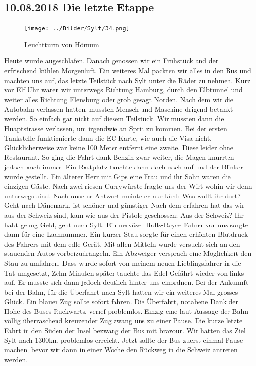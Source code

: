 \subsection{10.08.2018 Die letzte Etappe}

\begin{figure} 
  \begin{centering}
    \texttt{[image: ../Bilder/Sylt/34.png]}
    \caption{Leuchtturm von Hörnum}
  \end{centering}
\end{figure} 

Heute wurde augeschlafen.
Danach genossen wir ein Frühstück and der erfrischend kühlen Morgenluft.
Ein weiteres Mal packten wir alles in den Bus und machten uns auf, das letzte Teilstück nach Sylt unter die Räder zu nehmen.
Kurz vor Elf Uhr waren wir unterwegs Richtung Hamburg, durch den Elbtunnel und weiter alles Richtung Flensburg oder grob gesagt Norden.
Nach dem wir die Autobahn verlassen hatten, mussten Mensch und Maschine drigend betankt werden.
So einfach gar nicht auf diesem Teilstück.
Wir mussten dann die Huaptstrasse verlassen, um irgendwie an Sprit zu kommen.
Bei der ersten Tankstelle funktionierte dann die EC Karte, wie auch die Visa nicht.
Glücklicherweise war keine 100 Meter entfernt eine zweite.
Diese leider ohne Restaurant.
So ging die Fahrt dank Benzin zwar weiter, die Magen knurrten jedoch noch immer.
Ein Rastplatz tauchte dann doch noch auf und der Blinker wurde gestellt.
Ein älterer Herr mit Gips eine Frau und ihr Sohn waren die einzigen Gäste.
Nach zwei riesen Currywürste fragte uns der \glqq Wirt\grqq{} wohin wir denn unterwegs sind.
Nach unserer Antwort meinte er nur kühl: \glqq Was wollt ihr dort? Geht nach Dänemark, ist schöner und günstiger\grqq{}
Nach dem erfahren hat das wir aus der Schweiz sind, kam wie aus der Pistole geschossen: \glqq Aus der Schweiz? Ihr habt genug Geld, geht nach Sylt.\grqq{}
Ein nervöser Rolls-Royce Fahrer vor uns sorgte dann für eine Lachnummer.
Ein kurzer Stau sorgte für einen erhöhten Blutdruck des Fahrers mit dem edle Gerät.
Mit allen Mitteln wurde versucht sich an den stauenden Autos vorbeizudrängeln. 
Ein Abzweiger versprach eine Möglichkeit den Stau zu umfahren.
Dass wurde sofort von meinem neuen Lieblingsfahrer in die Tat umgesetzt,
Zehn Minuten später tauchte das Edel-Gefährt wieder von links auf. 
Er musste sich dann jedoch deutlich hinter uns einordnen.
Bei der Ankunnft bei der Bahn, für die Überfahrt nach Sylt hatten wir ein weiteres Mal grosses Glück.
Ein blauer Zug sollte sofort fahren.
Die Überfahrt, notabene Dank der Höhe des Buses Rückwärts, verief problemlos.
Einzig eine laut Aussage der Bahn völlig überraschend kreuzender Zug zwang uns zu einer Pause.
Die kurze letzte Fahrt in den Süden der Insel bezwang der Bus mit bravour.
Wir hatten das Ziel Sylt nach 1300km problemlos erreicht.
Jetzt sollte der Bus zuerst einmal Pause machen, bevor wir dann in einer Woche den Rückweg in die Schweiz antreten werden.

